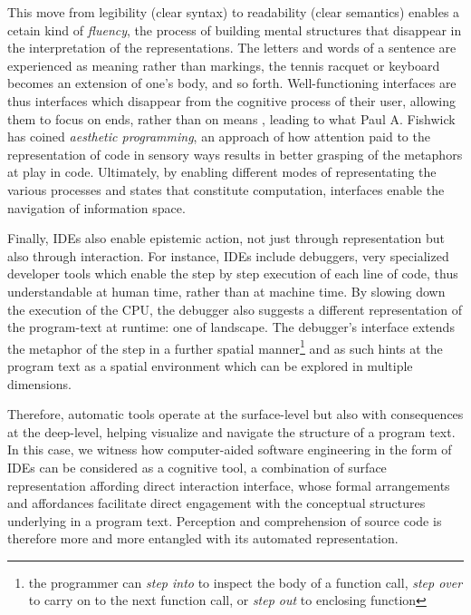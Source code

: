 This move from legibility (clear syntax) to readability (clear semantics) enables a cetain kind of \emph{fluency}, the process of building mental structures that disappear in the interpretation of the representations. The letters and words of a sentence are experienced as meaning rather than markings, the tennis racquet or keyboard becomes an extension of one's body, and so forth. Well-functioning interfaces are thus interfaces which disappear from the cognitive process of their user, allowing them to focus on ends, rather than on means \citep{galloway_interface_2012}, leading to what Paul A. Fishwick has coined \emph{aesthetic programming}, an approach of how attention paid to the representation of code in sensory ways results in better grasping of the metaphors at play in code. Ultimately, by enabling different modes of representating the various processes and states that constitute computation, interfaces enable the navigation of information space.

Finally, IDEs also enable epistemic action, not just through representation but also through interaction. For instance, IDEs include debuggers, very specialized developer tools which enable the step by step execution of each line of code, thus understandable at human time, rather than at machine time. By slowing down the execution of the CPU, the debugger also suggests a different representation of the program-text at runtime: one of landscape. The debugger's interface extends the metaphor of the step in a further spatial manner\footnote{the programmer can \emph{step into} to inspect the body of  a function call, \emph{step over} to carry on to the next function call, or \emph{step out} to enclosing function} and as such hints at the program text as a spatial environment which can be explored in multiple dimensions. 

Therefore, automatic tools operate at the surface-level but also with consequences at the deep-level, helping visualize and navigate the structure of a program text. In this case, we witness how computer-aided software engineering in the form of IDEs can be considered as a cognitive tool, a combination of surface representation affording direct interaction  interface, whose formal arrangements and affordances facilitate direct engagement with the conceptual structures underlying in a program text. Perception and comprehension of source code is therefore more and more entangled with its automated representation.

